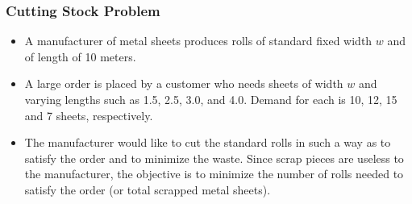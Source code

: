 \documentclass[11pt]{beamer}
\begin{document}
\begin{frame}

\begin{figure}
\centering
{}

\end{figure}
\end{frame}
\begin{frame}
\frametitle{Cutting Stock Problem}
\begin{itemize}
\item A manufacturer of metal sheets produces rolls of standard fixed width $w$ and of length of 10 meters.
\item A large order is placed by a customer who needs sheets of width $w$ and varying lengths such as 1.5, 2.5, 3.0, and 4.0. Demand for each is 10, 12, 15 and 7 sheets, respectively.
\item The manufacturer would like to cut the standard rolls in such a way as to satisfy the order and to minimize the waste. Since scrap pieces are useless to the manufacturer, the objective is to minimize the number of rolls needed to satisfy the order (or total scrapped metal sheets).
\end{itemize}
\end{frame}
\end{document}
